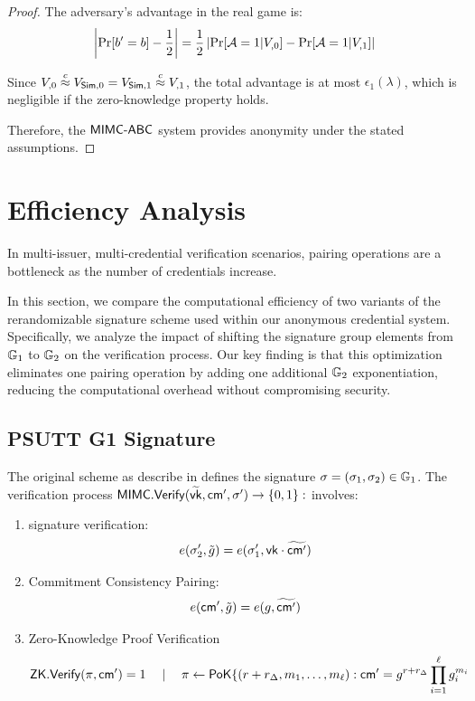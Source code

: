 \begin{proof}
    The adversary's advantage in the real game is:
    \[
    \left|\Pr[b' = b] - \frac{1}{2}\right| = \frac{1}{2} \left|\Pr[\Adv = 1 | V_{\real,0}] - \Pr[\Adv = 1 | V_{\real,1}]\right|
    \]
    
    Since $V_{\real,0} \stackrel{c}{\approx} V_{\Sim,0} = V_{\Sim,1} \stackrel{c}{\approx} V_{\real,1}$, the total advantage is at most $\epsilon_1(\lambda)$, which is negligible if the zero-knowledge property holds.
    
    Therefore, the $\mathsf{MIMC\text{-}ABC}$ system provides anonymity under the stated assumptions.
\end{proof}


\newpage


\section{Efficiency Analysis}

In multi-issuer, multi-credential verification scenarios, pairing operations are a bottleneck as the number of credentials increase. 

In this section, we compare the computational efficiency of two variants of the rerandomizable signature scheme used within our anonymous credential system. Specifically, we analyze the impact of shifting the signature group elements from $\mathbb{G}_1$ to $\mathbb{G}_2$ on the verification process. Our key finding is that this optimization eliminates one pairing operation by adding one additional $\mathbb{G}_2$ exponentiation, reducing the computational overhead without compromising security.

\subsection{PSUTT  G1 Signature}
\cite{tomescu2022utt}
The original scheme as describe in \cite{tomescu2022utt} defines the signature $\sigma = (\sigma_1, \sigma_2) \in \mathbb{G}_1$. The verification process $\mathsf{MIMC.Verify}(\widetilde{\mathsf{vk}}, \mathsf{cm}', {\sigma}') \to \{0,1\}:$  involves:
\begin{enumerate}
    \item signature verification:
    \[
    e(\sigma_2', \tilde{g}) = e(\sigma_1', \mathsf{vk} \cdot \widetilde{\mathsf{cm}'})
    \]
    \item Commitment Consistency Pairing: 
    \[
    e(\mathsf{cm}', \tilde{g}) = e(g, \widetilde{\mathsf{cm}'})
    \]
    \item Zero-Knowledge Proof Verification
    \[
    \mathsf{ZK.Verify}(\pi, \mathsf{cm}') = 1 \quad \mid \quad \pi \gets \mathsf{PoK}\{(r + r_\Delta, m_1,\ldots,m_\ell): \mathsf{cm}' = g^{r + r_\Delta} \prod_{i=1}^\ell g_i^{m_i}
    \]
\end{enumerate}


